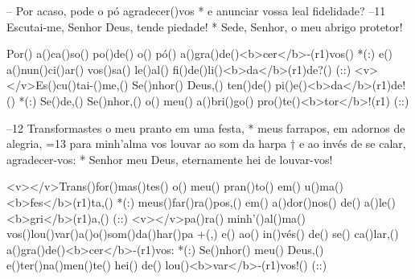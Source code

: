 – Por acaso, pode o pó agradecer()vos *
e anunciar vossa leal fidelidade?
–11 Escutai-me, Senhor Deus, tende piedade! *
Sede, Senhor, o meu abrigo protetor!

Por() a()ca()so() po()de() o() pó() a()gra()de()<b>cer</b>-(r1)vos() *(:)
e() a()nun()ci()ar() vos()sa() le()al() fi()de()li()<b>da</b>(r1)de?() (::)
<v></v>Es()cu()tai-()me,() Se()nhor() Deus,() ten()de() pi()e()<b>da</b>(r1)de!() *(:)
Se()de,() Se()nhor,() o() meu() a()bri()go() pro()te()<b>tor</b>!(r1) (::)

–12 Transformastes o meu pranto em uma festa, *
meus farrapos, em adornos de alegria,
=13 para minh’alma vos louvar ao som da harpa †
e ao invés de se calar, agradecer-vos: *
Senhor meu Deus, eternamente hei de louvar-vos!

<v></v>Trans()for()mas()tes() o() meu() pran()to() em() u()ma() <b>fes</b>(r1)ta,() *(:)
meus()far()ra()pos,() em() a()dor()nos() de() a()le()<b>gri</b>(r1)a,() (::)
<v></v>pa()ra() minh'()al()ma() vos()lou()var()a()o()som()da()har()pa +(,)
e() ao() in()vés() de() se() ca()lar,() a()gra()de()<b>cer</b>-(r1)vos: *(:)
Se()nhor() meu() Deus,() e()ter()na()men()te() hei() de() lou()<b>var</b>-(r1)vos!() (::)

